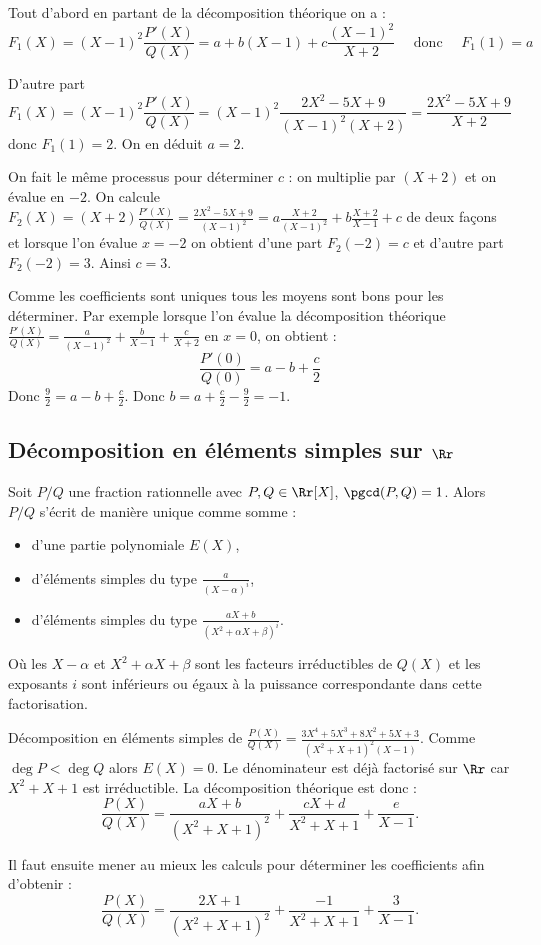 \documentclass[class=report,crop=false]{standalone}
\begin{document}
\begin{exemple}
\begin{itemize}
Tout d'abord en partant de la décomposition théorique on a :
$$F_1(X)= (X-1)^2 \frac{P'(X)}{Q(X)} = a + b(X-1) + c\frac{(X-1)^2}{X+2} \quad
\text{ donc } \quad F_1(1)=a$$

D'autre part
$$F_1(X)=(X-1)^2 \frac{P'(X)}{Q(X)}= (X-1)^2\frac{2X^2-5X+9}{(X-1)^2 (X+2)}
= \frac{2X^2-5X+9}{X+2}$$
donc $F_1(1)=2.$
On en déduit $a=2$.

On fait le même processus pour déterminer $c$ : on
multiplie par $(X+2)$ et on évalue en $-2$. On calcule
$F_2(X) = (X+2)\frac{P'(X)}{Q(X)} = \frac{2X^2-5X+9}{(X-1)^2} = a\frac{X+2}{(X-1)^2} + b\frac{X+2}{X-1} + c$
de deux façons et lorsque l'on évalue $x=-2$ on obtient d'une part $F_2(-2) = c$ et
d'autre part $F_2(-2) = 3$. Ainsi $c=3$.

Comme les coefficients sont uniques tous les moyens sont bons pour les déterminer.
Par exemple lorsque l'on évalue la décomposition théorique
$\frac{P'(X)}{Q(X)}= \frac{a}{(X-1)^2} + \frac{b}{X-1} + \frac{c}{X+2}$
en $x=0$, on obtient :
$$\frac{P'(0)}{Q(0)} = a - b + \frac c2$$
Donc $\frac{9}{2} = a - b + \frac c2$. Donc $b=a + \frac c2 - \frac{9}{2}=-1$.
\end{itemize}
\end{exemple}

\subsection{Décomposition en éléments simples sur $\Rr$}

\begin{theoreme}
Soit $P/Q$ une fraction rationnelle avec $P,Q \in \Rr[X]$, $\pgcd(P,Q)=1$.
Alors $P/Q$ s'écrit de manière unique comme somme :
\begin{itemize}
  \item d'une partie polynomiale $E(X)$,
  \item d'éléments simples du type $\frac{a}{(X-\alpha)^i}$,
  \item d'éléments simples du type $\frac{aX+b}{(X^2+\alpha X + \beta)^i}$.
\end{itemize}
Où les $X-\alpha$ et $X^2+\alpha X + \beta$ sont les facteurs irréductibles de $Q(X)$
et les exposants $i$ sont inférieurs ou égaux à la puissance correspondante dans cette factorisation.
\end{theoreme}

\begin{exemple}
Décomposition en éléments simples de
$\frac{P(X)}{Q(X)}=\frac{3X^4+5X^3+8X^2+5X+3}{(X^2+X+1)^2(X-1)}$.
Comme $\deg P < \deg Q$ alors $E(X)=0$.
Le dénominateur est déjà factorisé sur $\Rr$ car $X^2+X+1$ est irréductible.
La décomposition théorique est donc :
$$\frac{P(X)}{Q(X)} = \frac{aX+b}{(X^2+X+1)^2}+\frac{cX+d}{X^2+X+1}+\frac{e}{X-1}.$$

Il faut ensuite mener au mieux les calculs pour déterminer les coefficients afin d'obtenir :
$$\frac{P(X)}{Q(X)} = \frac{2X+1}{(X^2+X+1)^2}+\frac{-1}{X^2+X+1}+\frac{3}{X-1}.$$
\end{exemple}
\end{document}
